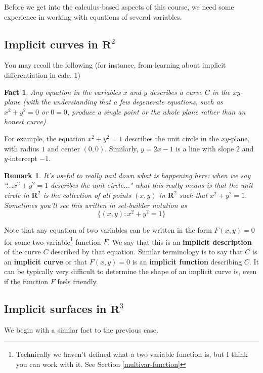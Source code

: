 \documentclass[12pt]{article}
\numberwithin{equation}{subsection}
\numberwithin{figure}{subsection}
\newtheorem{fact}[subsection]{Fact}
\theoremstyle{note}
\newtheorem{remark}[subsection]{Remark}
\begin{document}
{Before we get into the calculus-based aspects of this course, we need some experience in working with equations of several variables. 

\subsection{Implicit curves in $\mathbf{R}^2$}

You may recall the following (for instance, from learning about implicit differentiation in calc. 1)
\begin{fact} 
Any equation in the variables $x$ and $y$ describes a curve $C$ in the $xy$-plane (with the understanding that a few degenerate equations, such as $x^2+y^2=0$ or $0=0$, produce a single point or the whole plane rather than an honest curve)
\end{fact}

For example, the equation $x^2+y^2=1$ describes the unit circle in the $xy$-plane, with radius $1$ and center $(0,0)$. Similarly, $y=2x-1$ is a line with slope $2$ and $y$-intercept $-1$. 

\begin{remark} It's useful to really nail down what is happening here: when we say ``...$x^2+y^2=1$ describes the unit circle..." what this really means is that the unit circle in $\mathbf{R}^2$ is the collection of all points $(x,y)$ in $\mathbf{R}^2$ such that $x^2+y^2=1$. Sometimes you'll see this written in \textit{set-builder notation} as \[ \{ (x,y) : x^2+y^2=1\}\]  \end{remark}


Note that any equation of two variables can be written in the form $F(x,y)=0$ for some two variable\footnote{Technically we haven't defined what a two variable function is, but I think you can work with it. See Section \ref{multivar-function}} function $F$. We say that this is an \textbf{implicit description} of the curve $C$ described by that equation. Similar terminology is to say that  $C$ is an \textbf{implicit curve} or that $F(x,y)=0$ is an \textbf{implicit function} describing $C$. It can be typically very difficult to determine the shape of an implicit curve is, even if the function $F$ feels friendly.

\subsection{Implicit surfaces in $\mathbf{R}^3$}
We begin with a similar fact to the previous case. 

}
\end{document}
